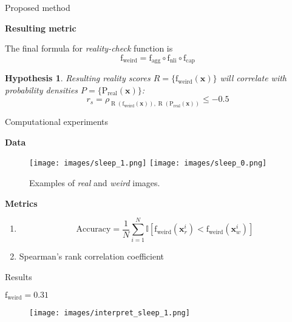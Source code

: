 \documentclass{beamer}
\newtheorem{hyp}{Hypothesis}
\begin{document}
\begin{frame}{Proposed method}

\textbf{Resulting metric}

The final formula for \textit{reality-check} function is \[\text{f}_\text{weird} = \text{f}_\text{agg} \circ \text{f}_\text{nli} \circ \text{f}_\text{cap}\]

\begin{hyp}
Resulting reality scores $R = \{\text{f}_\text{weird}(\textbf{x})\}$ will correlate with probability densities $P = \{\mathrm{P}_\text{real} (\textbf{x})\}$:
\[\displaystyle r_{s} = \rho _{\operatorname {R} (\text{f}_\text{weird}(\textbf{x})),\operatorname {R} (\mathrm{P}_\text{real} (\textbf{x}))} \le -0.5\]
\end{hyp}
\end{frame}

\begin{frame}{Computational experiments}

\textbf{Data}

\begin{figure}
    \centering
  \texttt{[image: images/sleep\_1.png]} 
  \texttt{[image: images/sleep\_0.png]}
  \caption {Examples of \textit{real} and \textit{weird} images.}
  \label{fig:data}
\end{figure}

\textbf{Metrics}

\begin{enumerate}
    \item \[\text{Accuracy} = \frac1N \sum\limits_{i=1}^N \mathbb{I}[\text{f}_\text{weird}(\textbf{x}^i_r) < \text{f}_\text{weird}(\textbf{x}^i_w)]\]
    \item Spearman's rank correlation coefficient
\end{enumerate}


\end{frame}

\begin{frame}{Results}

$\text{f}_\text{weird} = 0.31$

\begin{figure}[ht]
  \texttt{[image: images/interpret\_sleep\_1.png]}
  \label{fig:experiments}
\end{figure}
\end{frame}
\end{document}
